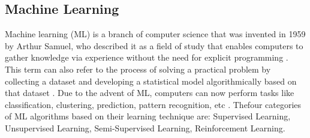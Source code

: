 \documentclass[12pt]{diazessay}
\newcommand{\RomanNumeralCaps}[1]
{\MakeUppercase{\romannumeral #1}}
\begin{document}
    \subsection{Machine Learning} 
    \hspace{0.7cm} Machine learning (ML) is a branch of computer science that was invented in 1959 by Arthur Samuel, who described it as a field of study that enables computers to gather knowledge via experience without the need for explicit programming \cite{Samuel1959-rx}. This term can also refer to the process of solving a practical problem by collecting a dataset and developing a statistical model algorithmically based on that dataset \cite{Burkov2019-rd}. Due to the advent of ML, computers can now perform tasks like classification, clustering, prediction, pattern recognition, etc \cite{Zantalis2019-cl}. Thefour categories of ML algorithms based on their learning technique are: Supervised Learning, Unsupervised Learning, Semi-Supervised Learning, Reinforcement Learning.
   \\ 
   
    
    
\end{document}
